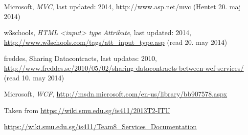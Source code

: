 \documentclass[../report.tex]{subfiles}
\begin{document}
\graphicspath{{img/}{../img/}}
\begingroup
\renewcommand{\chapter}[2]{}%
\begin{thebibliography}{}

Microsoft, \textit{MVC}, last updated: 2014, \url{http://www.asp.net/mvc} (Hentet  20. maj 2014)

w3schools, \textit{HTML <input> type Attribute}, last updated: 2014,  \url{http://www.w3schools.com/tags/att\_input\_type.asp} (read 20. may 2014)

freddes, Sharing Datacontracts, last updates: 2010, \url{http://www.freddes.se/2010/05/02/sharing-datacontracts-between-wcf-services/} (read 10. may 2014)

Microsoft, \textit{WCF}, \url{http://msdn.microsoft.com/en-us/library/bb907578.aspx}

Taken from \url{https://wiki.smu.edu.sg/is411/2013T2-ITU}

\url{https://wiki.smu.edu.sg/is411/Team8\_Services\_Documentation}


\end{thebibliography}
\endgroup
\end{document}
